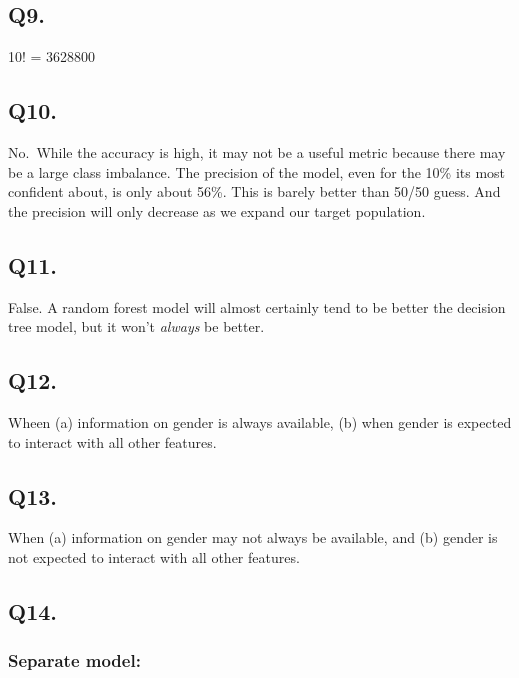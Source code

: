 \documentclass[]{article}
\begin{document}
\hypertarget{q9.}{%
\subsection{Q9.}\label{q9.}}

10! = 3628800

\hypertarget{q10.}{%
\subsection{Q10.}\label{q10.}}

No.~While the accuracy is high, it may not be a useful metric because
there may be a large class imbalance. The precision of the model, even
for the 10\% its most confident about, is only about 56\%. This is
barely better than 50/50 guess. And the precision will only decrease as
we expand our target population.

\hypertarget{q11.}{%
\subsection{Q11.}\label{q11.}}

False. A random forest model will almost certainly tend to be better the
decision tree model, but it won't \emph{always} be better.

\hypertarget{q12.}{%
\subsection{Q12.}\label{q12.}}

Wheen (a) information on gender is always available, (b) when gender is
expected to interact with all other features.

\hypertarget{q13.}{%
\subsection{Q13.}\label{q13.}}

When (a) information on gender may not always be available, and (b)
gender is not expected to interact with all other features.

\hypertarget{q14.}{%
\subsection{Q14.}\label{q14.}}

\hypertarget{separate-model}{%
\subsubsection{Separate model:}\label{separate-model}}
\end{document}
